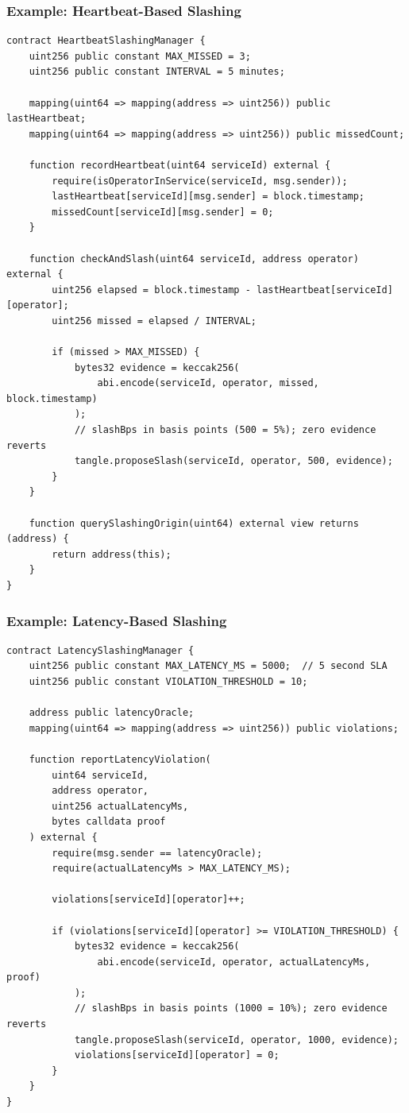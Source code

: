 \documentclass[11pt,a4paper]{article}
\begin{document}
\subsubsection{Example: Heartbeat-Based Slashing}

\begin{lstlisting}[style=solidity]
contract HeartbeatSlashingManager {
    uint256 public constant MAX_MISSED = 3;
    uint256 public constant INTERVAL = 5 minutes;

    mapping(uint64 => mapping(address => uint256)) public lastHeartbeat;
    mapping(uint64 => mapping(address => uint256)) public missedCount;

    function recordHeartbeat(uint64 serviceId) external {
        require(isOperatorInService(serviceId, msg.sender));
        lastHeartbeat[serviceId][msg.sender] = block.timestamp;
        missedCount[serviceId][msg.sender] = 0;
    }

    function checkAndSlash(uint64 serviceId, address operator) external {
        uint256 elapsed = block.timestamp - lastHeartbeat[serviceId][operator];
        uint256 missed = elapsed / INTERVAL;

        if (missed > MAX_MISSED) {
            bytes32 evidence = keccak256(
                abi.encode(serviceId, operator, missed, block.timestamp)
            );
            // slashBps in basis points (500 = 5%); zero evidence reverts
            tangle.proposeSlash(serviceId, operator, 500, evidence);
        }
    }

    function querySlashingOrigin(uint64) external view returns (address) {
        return address(this);
    }
}
\end{lstlisting}

\subsubsection{Example: Latency-Based Slashing}

\begin{lstlisting}[style=solidity]
contract LatencySlashingManager {
    uint256 public constant MAX_LATENCY_MS = 5000;  // 5 second SLA
    uint256 public constant VIOLATION_THRESHOLD = 10;

    address public latencyOracle;
    mapping(uint64 => mapping(address => uint256)) public violations;

    function reportLatencyViolation(
        uint64 serviceId,
        address operator,
        uint256 actualLatencyMs,
        bytes calldata proof
    ) external {
        require(msg.sender == latencyOracle);
        require(actualLatencyMs > MAX_LATENCY_MS);

        violations[serviceId][operator]++;

        if (violations[serviceId][operator] >= VIOLATION_THRESHOLD) {
            bytes32 evidence = keccak256(
                abi.encode(serviceId, operator, actualLatencyMs, proof)
            );
            // slashBps in basis points (1000 = 10%); zero evidence reverts
            tangle.proposeSlash(serviceId, operator, 1000, evidence);
            violations[serviceId][operator] = 0;
        }
    }
}
\end{lstlisting}
\end{document}
